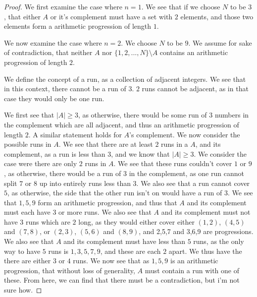 \begin{proof}
  We first examine the case where $n=1$. We see that if we choose $N$
  to be $3$, that either $A$ or it's complement must have a set with
  $2$ elements, and those two elements form a arithmetic progression
  of length $1$.

  We now examine the case where $n=2$. We choose $N$ to
  be $9$. We assume for sake of contradiction, that neither $A$ nor 
  $\{1,2,...,N\} \setminus A$ contains an arithmetic progression 
  of length $2$. 

  We define the concept of a run, as a collection of adjacent
  integers. We see that in this context, there cannot be a run of
  $3$. $2$ runs cannot be adjacent, as in that case they would only be
  one run.

  We first see that $|A|\geq 3$, as otherwise, there
  would be some run of $3$ numbers in the complement which 
  are all adjacent, and thus an
  arithmetic progression of length $2$. A similar statement holds for
  $A$'s complement. We now consider the possible
  runs in $A$. We see that there are at least $2$ runs in a $A$, and
  its complement, as a run is less than $3$, and we know that $|A|\geq
  3$. We consider the case were there are only $2$ runs in $A$. 
  We see that these runs couldn't cover $1$ or $9$, as otherwise,
  there would be a run of $3$ in the complement, as one run cannot
  split $7$ or $8$ up into entirely runs less than $3$. We also see
  that a run cannot cover $5$, as otherwise, the side that the other
  run isn't on would have a run of $3$. We see that $1,5,9$ form an
  arithmetic progression, and thus that $A$ and its complement must
  each have $3$ or more runs. We also see that $A$ and its complement
  must not have $3$ runs which are $2$ long, as they would either
  cover either $(1,2)$, $(4,5)$ and $(7,8)$, or $(2,3)$, $(5,6)$ and
  $(8,9)$, and 2,5,7 and 3,6,9 are progressions. We also see that $A$
  and its complement must have less than $5$ runs, as the only way to
  have $5$ runs is $1,3,5,7,9$, and these are each $2$ apart. We thus
  have the there are either $3$ or $4$ runs. We now see that as
  $1,5,9$ is an arithmetic progression, that without loss of
  generality, $A$ must contain a run with one of these. From here, we
  can find that there must be a contradiction, but i'm not sure how.
\end{proof}


